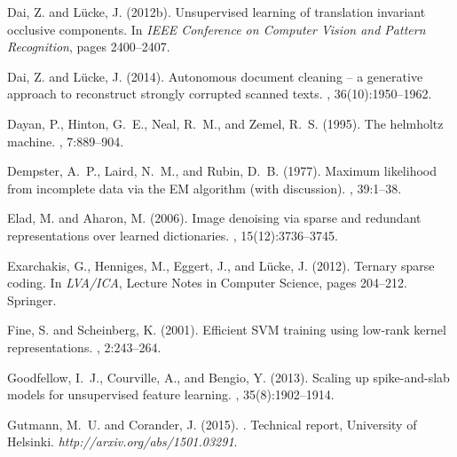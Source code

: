 \documentclass[12pt]{article}
\begin{document}
\begin{thebibliography}{}
Dai, Z. and L\"{u}cke, J. (2012b).
\newblock Unsupervised learning of translation invariant occlusive components.
\newblock In {\em IEEE Conference on Computer Vision and Pattern Recognition},
  pages 2400--2407.

Dai, Z. and L\"{u}cke, J. (2014).
\newblock Autonomous document cleaning -- a generative approach to reconstruct
  strongly corrupted scanned texts.
,
  36(10):1950--1962.

Dayan, P., Hinton, G.~E., Neal, R.~M., and Zemel, R.~S. (1995).
\newblock The helmholtz machine.
, 7:889--904.

Dempster, A.~P., Laird, N.~M., and Rubin, D.~B. (1977).
\newblock Maximum likelihood from incomplete data via the {EM} algorithm (with
  discussion).
, 39:1--38.

Elad, M. and Aharon, M. (2006).
\newblock Image denoising via sparse and redundant representations over learned
  dictionaries.
, 15(12):3736--3745.

Exarchakis, G., Henniges, M., Eggert, J., and L{\"u}cke, J. (2012).
\newblock Ternary sparse coding.
\newblock In {\em LVA/ICA}, Lecture Notes in Computer Science, pages 204--212.
  Springer.

Fine, S. and Scheinberg, K. (2001).
\newblock Efficient {SVM} training using low-rank kernel representations.
, 2:243--264.

Goodfellow, I.~J., Courville, A., and Bengio, Y. (2013).
\newblock Scaling up spike-and-slab models for unsupervised feature learning.
,
  35(8):1902--1914.

Gutmann, M.~U. and Corander, J. (2015).
.
\newblock Technical report, University of Helsinki.
\newblock \emph{http://arxiv.org/abs/1501.03291}.


\end{thebibliography}
\end{document}

